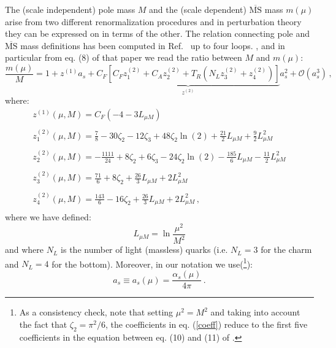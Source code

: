 \documentclass[10pt,a4paper]{article}
\begin{document}
The (scale independent) pole mass $M$ and the (scale dependent)
$\overline{\mbox{MS}}$ mass $m(\mu)$ arise from two different
renormalization procedures and in perturbation theory they can be
expressed on in terms of the other. The relation connecting pole and
$\overline{\mbox{MS}}$ mass definitions has been computed in
Ref.~\cite{Chetyrkin:1999qi} up to four loops.
, and in particular from eq. (8) of that paper
we read the ratio between $M$ and $m(\mu)$:
\begin{equation}\label{straight}
\frac{m(\mu)}{M} = 1 + z^{(1)}a_s+\underbrace{C_F\left[C_Fz_1^{(2)}+C_Az_2^{(2)}+T_R\left(N_Lz_3^{(2)}+z_4^{(2)}\right)\right]}_{z^{(2)}}a_s^2+\mathcal{O}(a_s^3)\,,
\end{equation}
where:
\begin{equation}\label{coeff}
\begin{array}{l}
\displaystyle z^{(1)}(\mu,M) = C_F\left(- 4 - 3L_{\mu M}\right)\\
\\
\displaystyle z_{1}^{(2)}(\mu,M) = \frac{7}{8} - 30\zeta_2 - 12\zeta_3 + 48\zeta_2\ln(2) + \frac{21}2L_{\mu M} + \frac92 L_{\mu M}^2\\
\\
\displaystyle z_{2}^{(2)}(\mu,M) = -\frac{1111}{24} + 8\zeta_2 +6\zeta_3 - 24\zeta_2\ln(2) - \frac{185}6L_{\mu M} - \frac{11}2 L_{\mu M}^2\\
\\
\displaystyle z_{3}^{(2)}(\mu,M) = \frac{71}{6} + 8\zeta_2 + \frac{26}3L_{\mu M} + 2 L_{\mu M}^2\\
\\
\displaystyle z_{4}^{(2)}(\mu,M) = \frac{143}{6} -16\zeta_2 + \frac{26}3L_{\mu M} + 2 L_{\mu M}^2\,,\\
\end{array}
\end{equation}
where we have defined:
\begin{equation}
L_{\mu M} = \ln\frac{\mu^2}{M^2}
\end{equation}
and where $N_L$ is the number of light (massless) quarks (i.e. $N_L=3$ for the charm and $N_L=4$ for the bottom). Moreover, in our notation we use(\footnote{As a consistency check, note that setting $\mu^2=M^2$ and taking into account the fact that $\zeta_2 = \pi^2/6$, the coefficients in eq. (\ref{coeff}) reduce to the first five coefficients in the equation between eq. (10) and (11) of \cite{Melnikov:2000qh}.}):
\begin{equation}
a_s\equiv a_s(\mu) = \frac{\alpha_s(\mu)}{4\pi}\,.
\end{equation}
\end{document}
